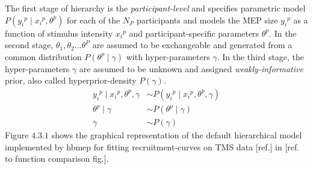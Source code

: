 \documentclass[a4paper,12pt]{article}
\begin{document}

The first stage of hierarchy is the \textit{participant-level} and specifies parametric model $P\left({y_i}^p \mid {x_i}^p, \theta^p\right)$ for each of the $N_P$ participants and models the MEP size ${y_i}^p$ as a function of stimulus intensity ${x_i}^p$ and participant-specific parameters $\theta^p$. In the second stage, $\theta_1, \theta_2 \ldots \theta^P$ are assumed to be exchangeable and generated from a common distribution $P\left(\theta^p \mid \gamma\right)$ with hyper-parameters $\gamma$. In the third stage, the hyper-parameters $\gamma$ are assumed to be unknown and assigned \textit{weakly-informative} prior, also called hyperprior-density $P\left(\gamma\right)$.
\begin{align*}
{y_i}^p \mid {x_i}^p, \theta^p, \gamma &\sim P\left({y_i}^p \mid {x_i}^p, \theta^p, \gamma\right) \tag{4.2.1} \\
\theta^p \mid \gamma &\sim P\left(\theta^p \mid \gamma\right) \tag{4.2.2} \\
\gamma &\sim P\left(\gamma\right) \tag{4.2.3}
\end{align*}
Figure $4.3.1$ shows the graphical representation of the default hierarchical model implemented by hbmep for fitting recruitment-curves on TMS data [ref.] in [ref. to function comparison fig.].\\
\end{document}
